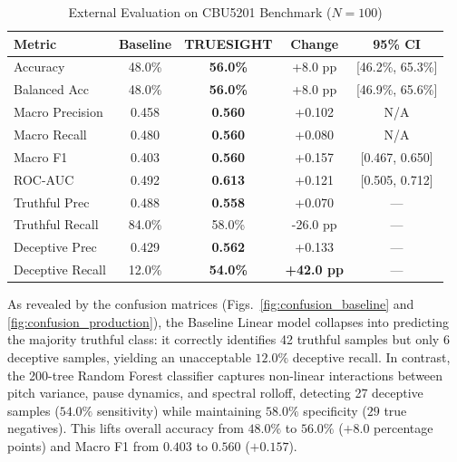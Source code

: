 \documentclass[conference]{IEEEtran}
\begin{document}
\begin{table}[t]
\centering
\caption{External Evaluation on CBU5201 Benchmark ($N=100$)}
\label{tab:cbu_results}
\begin{tabular}{lcccc}
\toprule
\textbf{Metric} & \textbf{Baseline} & \textbf{TRUESIGHT} & \textbf{Change} & \textbf{95\% CI} \\
\midrule
Accuracy & 48.0\% & \textbf{56.0\%} & +8.0 pp & [46.2\%, 65.3\%] \\
Balanced Acc & 48.0\% & \textbf{56.0\%} & +8.0 pp & [46.9\%, 65.6\%] \\
Macro Precision & 0.458 & \textbf{0.560} & +0.102 & N/A \\
Macro Recall & 0.480 & \textbf{0.560} & +0.080 & N/A \\
Macro F1 & 0.403 & \textbf{0.560} & +0.157 & [0.467, 0.650] \\
ROC-AUC & 0.492 & \textbf{0.613} & +0.121 & [0.505, 0.712] \\
\midrule
Truthful Prec & 0.488 & \textbf{0.558} & +0.070 & — \\
Truthful Recall & 84.0\% & 58.0\% & -26.0 pp & — \\
Deceptive Prec & 0.429 & \textbf{0.562} & +0.133 & — \\
Deceptive Recall & 12.0\% & \textbf{54.0\%} & \textbf{+42.0 pp} & — \\
\bottomrule
\end{tabular}
\end{table}

As revealed by the confusion matrices (Figs.~\ref{fig:confusion_baseline} and \ref{fig:confusion_production}), the Baseline Linear model collapses into predicting the majority truthful class: it correctly identifies 42 truthful samples but only 6 deceptive samples, yielding an unacceptable $12.0\%$ deceptive recall. In contrast, the 200-tree Random Forest classifier captures non-linear interactions between pitch variance, pause dynamics, and spectral rolloff, detecting 27 deceptive samples ($54.0\%$ sensitivity) while maintaining $58.0\%$ specificity ($29$ true negatives). This lifts overall accuracy from $48.0\%$ to $56.0\%$ ($+8.0$ percentage points) and Macro F1 from $0.403$ to $0.560$ ($+0.157$).
\end{document}
